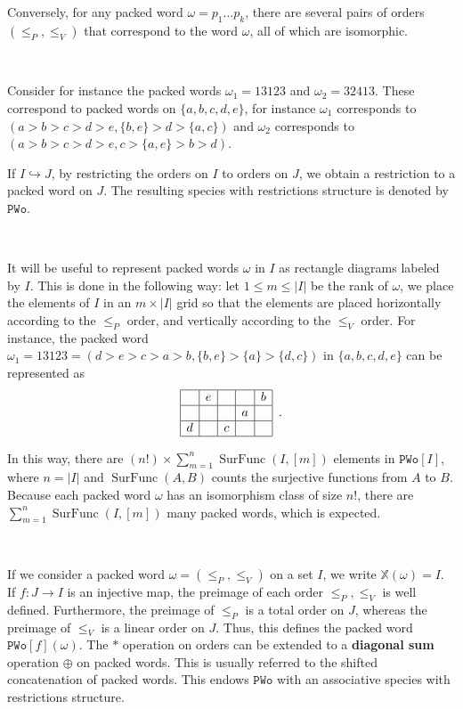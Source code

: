 \documentclass[12pt, reqno]{amsart}
\theoremstyle{definition}
\DeclareMathOperator{\sFunc}{\mathrm{SurFunc}}
\begin{document}
Conversely, for any packed word $\omega = p_1\dots p_k$, there are several pairs of orders $(\leq_P, \leq_V)$ that correspond to the word $\omega $, all of which are isomorphic.

\

Consider for instance the packed words $\omega_1 = 13123$ and $\omega_2 = 32413$.
These correspond to packed words on $\{a, b, c, d, e\}$, for instance $\omega_1$ corresponds to $(a > b > c > d > e, \{b, e\} > d > \{a, c\})$ and $\omega_2$ corresponds to $(a > b > c > d > e, c > \{a, e\} >  b > d)$.


If $I \hookrightarrow J$, by restricting the orders on $I$ to orders on $J$, we obtain a restriction to a packed word on $J$.
The resulting species with restrictions structure is denoted by $\mathtt{PWo}$.

\

It will be useful to represent packed words $\omega $ in $I$ as rectangle diagrams labeled by $I$.
This is done in the following way: let $1\leq m \leq |I|$ be the rank of $\omega$, we place the elements of $I$ in an $m \times |I|$ grid so that the elements are placed horizontally according to the $\leq_P$ order, and vertically according to the $\leq_V$ order.
For instance, the packed word $\omega_1 = 13123 = ( d > e > c > a > b, \{b, e\} > \{a\} > \{d, c\})$ in $\{a, b, c, d, e\}$ can be represented as 
\begin{equation}
\begin{array}{|c|c|c|c|c|}
	\hline   & e &   &   & b \\
    \hline   &   &   & a &   \\
    \hline d &   & c &   &   \\
    \hline 
\end{array}\, \, \, .
\end{equation}




In this way, there are $(n!) \times \sum_{m = 1}^n \sFunc(I, [m])$ elements in $\mathtt{PWo}[I]$, where $n = |I|$ and $\sFunc(A, B)$ counts the surjective functions from $A$ to $B$.
Because each packed word $\omega $ has an isomorphism class of size $n!$, there are $ \sum_{m = 1}^n \sFunc(I, [m])$ many packed words, which is expected.

\

\label{defin:pwo}
If we consider a packed word $\omega = (\leq_P, \leq_V) $ on a set $I$, we write $\mathbb{X}(\omega) = I$.
If $f:J \to I $ is an injective map, the preimage of each order $\leq_P, \leq_V$ is well defined.
Furthermore, the preimage of $\leq_P$ is a total order on $J$, whereas the preimage of $\leq_V$ is a linear order on $J$.
Thus, this defines the packed word $\mathtt{PWo}[f](\omega )$.
The $\ast $ operation on orders can be extended to a \textbf{diagonal sum} operation $\oplus $ on packed words.
This is usually referred to the shifted concatenation of packed words.
This endows $\mathtt{PWo}$ with an  associative species with restrictions structure.
\end{document}
